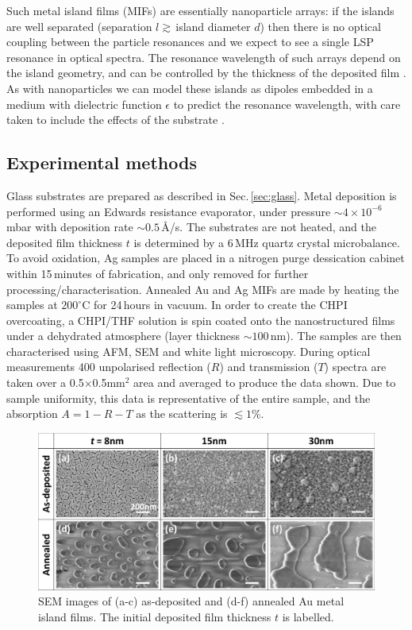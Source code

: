 Such metal island films (MIFs) are essentially nanoparticle arrays: if the islands are well separated (separation $l \gtrsim\,	$island diameter $d$) then there is no optical coupling between the particle resonances and we expect to see a single LSP resonance in optical spectra. The resonance wavelength of such arrays depend on the island geometry, and can be controlled by the thickness of the deposited film \cite{Walter2006, Sennett1950, Gupta2002, Gadenne2002, Lee1992}. As with nanoparticles we can model these islands as dipoles embedded in a medium with dielectric function $\epsilon$ to predict the resonance wavelength, with care taken to include the effects of the substrate \cite{Yamaguchi1960, Yamaguchi1972, Yamaguchi1973, Doremus1966}.

\subsection{Experimental methods}
Glass substrates are prepared as described in Sec.\,\ref{sec:glass}. Metal deposition is performed using an Edwards resistance evaporator, under pressure $\sim4\times10^{-6}$\,mbar with deposition rate $\sim0.5$\,\AA/s. The substrates are not heated, and the deposited film thickness $t$ is determined by a 6\,MHz quartz crystal microbalance. To avoid oxidation, Ag samples are placed in a nitrogen purge dessication cabinet within 15\,minutes of fabrication, and only removed for further processing/characterisation. Annealed Au and Ag MIFs are made by heating the samples at $200^{\circ}$C for 24\,hours in vacuum. In order to create the CHPI overcoating, a CHPI/THF solution is spin coated onto the nanostructured films under a dehydrated atmosphere (layer thickness $\sim100$\,nm). The samples are then characterised using AFM, SEM and white light microscopy. During optical measurements 400 unpolarised reflection ($R$) and transmission ($T$) spectra are taken over a 0.5$\times$0.5mm$^{2}$ area and averaged to produce the data shown. Due to sample uniformity, this data is representative of the entire sample, and the absorption $A = 1 - R - T$ as the scattering is $\lesssim1\%$.

\begin{figure}[h!] 
\centering    
\includegraphics[width=\textwidth]{Fig1}
\caption{SEM images of (a-c) as-deposited and (d-f) annealed Au metal island films. The initial deposited film thickness $t$ is labelled.}
\label{6Fig1}
\end{figure}
